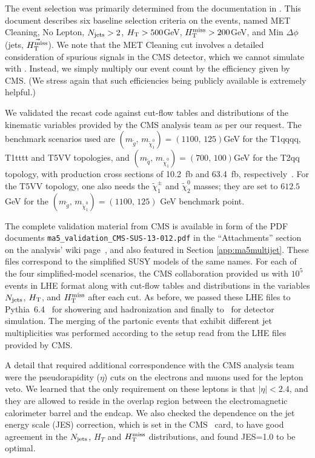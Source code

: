 The event selection was primarily determined from the documentation in \cite{Chatrchyan:2014lfa}. This document describes six baseline selection criteria on the events, named MET Cleaning, No Lepton, $N_{\rm jets}>2$, 
$H_{\rm T}>500$GeV, $H_{\text{T}}^{\rm miss}>200$GeV, and Min $\Delta\phi$({\rm jets}, $\vec{H_{\text{T}}^{\rm miss}}$). We note that the MET Cleaning cut involves a detailed consideration of spurious signals in the CMS detector, which we cannot simulate with \delphes. Instead, we simply multiply our event count by the efficiency given by CMS. (We stress again that such efficiencies being publicly available is extremely helpful.)

We validated the recast code against cut-flow tables and distributions of the kinematic variables provided by the CMS analysis team as per our request. The benchmark scenarios used are $(m_{\tilde g},\,m_{\tilde\chi^0_1})=(1100,\,125)$GeV for the   T1qqqq, T1tttt and T5VV topologies, and $(m_{\tilde q},\,m_{\tilde\chi^0_1})=(700,\,100)$GeV for the T2qq topology, 
with production cross sections of 10.2~fb and 63.4~fb, respectively~\cite{Kramer:2012bx}.  
For the T5VV topology, one also needs the $\tilde\chi^\pm_1$ and $\tilde\chi^0_2$ masses; 
they are set to $612.5$GeV for the $(m_{\tilde g},\,m_{\tilde\chi^0_1})=(1100,\,125)$ GeV benchmark point. 

The complete validation material from CMS is available in form of the PDF documents  
\texttt{ma5\_validation\_CMS-SUS-13-012.pdf} in the ``Attachments'' section 
on the analysis' wiki page~\cite{ma5wiki}, and also featured in Section \ref{app:ma5multijet}. 
These files correspond to the simplified SUSY models of the same names.  
For each of the four simplified-model scenarios, the CMS collaboration provided us with $10^5$ events in LHE format along with cut-flow tables and distributions in the variables $N_{\rm jets}$, $H_{\rm T}$, and $H_{\text{T}}^{\rm miss}$ after each cut. As before, we passed these LHE files to {\sc Pythia}~6.4~\cite{Sjostrand:2006za} for showering and hadronization and finally to \delphes\ for detector simulation. 
The merging of the partonic events that exhibit different jet multiplicities was performed according to the setup read from the LHE files provided by CMS. 

A detail that required additional correspondence with the CMS analysis team were the pseudorapidity ($\eta$) cuts on the electrons and muons used for the lepton veto. We learned that the only requirement on these leptons is that %
$|\eta|<2.4$, and they are allowed to reside in the overlap region between the electromagnetic calorimeter barrel and the endcap.  
We also checked the dependence on the jet energy scale (JES) correction, which is set in the CMS \delphes\ card, 
to have good agreement in the $N_{\rm jets}$, $H_{T}$ and $H_{\text{T}}^{\rm miss}$ distributions, and found JES=1.0 to be optimal. 


